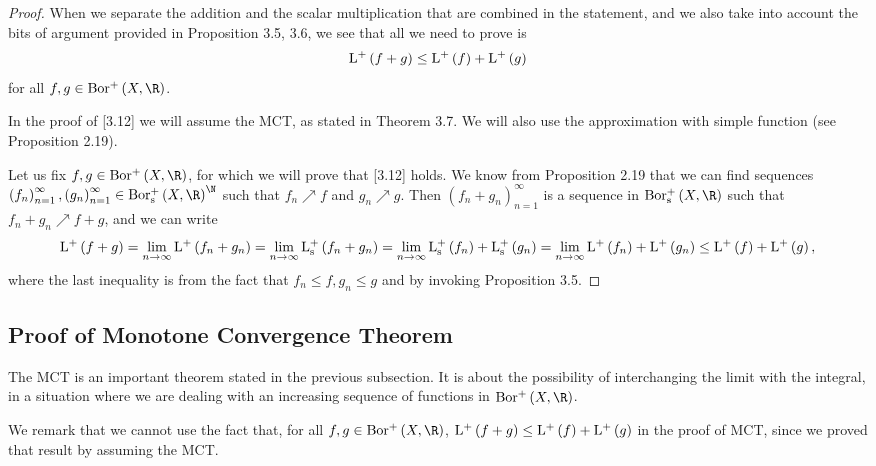\documentclass[pmath450]{subfiles}
\begin{document}
    \begin{proof}
        When we separate the addition and the scalar multiplication that are combined in the statement, and we also take into account the bits of argument provided in Proposition 3.5, 3.6, we see that all we need to prove is
        \begin{equation}
            \operatorname{L^+}\left( f+g \right)\leq\operatorname{L^+}\left( f \right)+\operatorname{L^+}\left( g \right)
        \end{equation}
        for all $f,g\in\borplus\left( X,\R \right)$. 

        In the proof of [3.12] we will assume the MCT, as stated in Theorem 3.7. We will also use the approximation with simple function (see Proposition 2.19).

        Let us fix $f,g\in\borplus\left( X,\R \right)$, for which we will prove that [3.12] holds. We know from Proposition 2.19 that we can find sequences $\left( f_{n} \right)^{\infty}_{n=1},\left( g_{n} \right)^{\infty}_{n=1}\in\borpluss\left( X,\R \right)^{\N}$ such that $f_n\nearrow f$ and $g_n\nearrow g$. Then $\left( f_{n}+g_{n} \right)^{\infty}_{n=1}$ is a sequence in $\borpluss\left( X,\R \right)$ such that $f_n+g_n\nearrow f+g$, and we can write
        \begin{equation*}
            \operatorname{L^+}\left( f+g \right) = \lim_{n\to\infty}\operatorname{L^+}\left( f_n+g_n \right) = \lim_{n\to\infty}\operatorname{L^+_s}\left( f_n+g_n \right) = \lim_{n\to\infty}\operatorname{L^+_s}\left( f_n \right)+\operatorname{L^+_s}\left( g_n \right) = \lim_{n\to\infty}\operatorname{L^+}\left( f_n \right)+\operatorname{L^+}\left( g_n \right) \leq \operatorname{L^+}\left( f \right) + \operatorname{L^+}\left( g \right),
        \end{equation*}
        where the last inequality is from the fact that $f_n\leq f, g_n\leq g$ and by invoking Proposition 3.5.
    \end{proof}

    \subsection{Proof of Monotone Convergence Theorem}
    
    The MCT is an important theorem stated in the previous subsection. It is about the possibility of interchanging the limit with the integral, in a situation where we are dealing with an increasing sequence of functions in $\borplus\left( X,\R \right)$.

    \np We remark that we cannot use the fact that, for all $f,g\in\borplus\left( X,\R \right)$, $\operatorname{L^+}\left( f+g \right)\leq \operatorname{L^+}\left( f \right)+\operatorname{L^+}\left( g \right)$ in the proof of MCT, since we proved that result by assuming the MCT.
\end{document}
